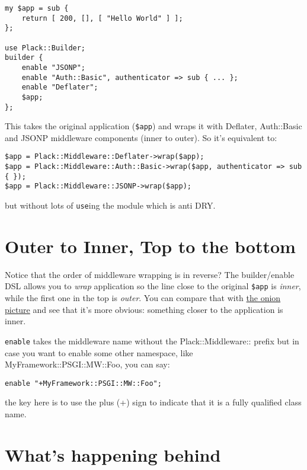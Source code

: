 \begin{lstlisting}
my $app = sub { 
    return [ 200, [], [ "Hello World" ] ];
};

use Plack::Builder;
builder {
    enable "JSONP";
    enable "Auth::Basic", authenticator => sub { ... };
    enable "Deflater";
    $app;
};
\end{lstlisting}

This takes the original application (\lstinline!$app!) and wraps it with
Deflater, Auth::Basic and JSONP middleware components (inner to outer).
So it's equivalent to:

\begin{lstlisting}
$app = Plack::Middleware::Deflater->wrap($app);
$app = Plack::Middleware::Auth::Basic->wrap($app, authenticator => sub { });
$app = Plack::Middleware::JSONP->wrap($app);
\end{lstlisting}

but without lots of \lstinline!use!ing the module which is anti DRY.

\section{Outer to Inner, Top to the
bottom}\label{outer-to-inner-top-to-the-bottom}

Notice that the order of middleware wrapping is in reverse? The
builder/enable DSL allows you to \emph{wrap} application so the line
close to the original \lstinline!$app! is \emph{inner}, while the first
one in the top is \emph{outer}. You can compare that with
\href{http://pylonshq.com/docs/en/0.9.7/_images/pylons_as_onion.png}{the
onion picture} and see that it's more obvious: something closer to the
application is inner.

\lstinline!enable! takes the middleware name without the
Plack::Middleware:: prefix but in case you want to enable some other
namespace, like MyFramework::PSGI::MW::Foo, you can say:

\begin{lstlisting}
enable "+MyFramework::PSGI::MW::Foo";
\end{lstlisting}

the key here is to use the plus (+) sign to indicate that it is a fully
qualified class name.

\section{What's happening behind}\label{whats-happening-behind}

